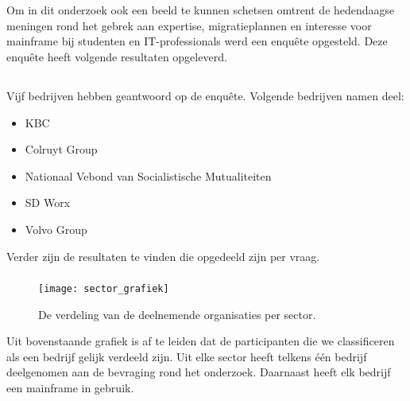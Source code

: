  
 \section{}
 \label{sec:De resultaten van de bevraging}
 
 Om in dit onderzoek ook een beeld te kunnen schetsen omtrent de hedendaagse meningen rond het gebrek aan expertise, migratieplannen en interesse voor mainframe bij studenten en IT-professionals werd een enquête opgesteld. Deze enquête heeft volgende resultaten opgeleverd.
 
  \subsection{}
 \label{sec:De resultaten van de bevraging}

Vijf bedrijven hebben geantwoord op de enquête. Volgende bedrijven namen deel: 
 \begin{itemize}
    \item KBC
    \item Colruyt Group
    \item Nationaal Vebond van Socialistische Mutualiteiten
    \item SD Worx
    \item Volvo Group
\end{itemize}

Verder zijn de resultaten te vinden die opgedeeld zijn per vraag. 

 \subsubsection{}
\label{sec:In welke sector is het bedrijf actief}

 \begin{figure}[h]
    \centering
    \texttt{[image: sector\_grafiek]}
    \caption{De verdeling van de deelnemende organisaties per sector.}
\end{figure}

Uit bovenstaande grafiek is af te leiden dat de participanten die we classificeren als een bedrijf gelijk verdeeld zijn. Uit elke sector heeft telkens één bedrijf deelgenomen aan de bevraging rond het onderzoek. Daarnaast heeft elk bedrijf een mainframe in gebruik. 


